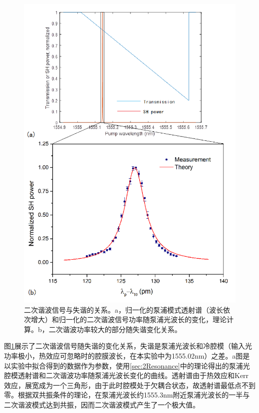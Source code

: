 \documentclass[UTF8,a4paper,cs4size,hyperref]{ctexart}
\begin{document}
\begin{figure}
\centering
\includegraphics[width=14cm ]{TransSHpower}
\caption{二次谐波信号与失谐的关系。a，归一化的泵浦模式透射谱（波长依次增大）和归一化的二次谐波信号功率随泵浦光波长的变化，理论计算。b，二次谐波功率较大的部分随失谐变化关系。}
\label{pic:TransSHpower}
\end{figure}

图\ref{pic:TransSHpower}展示了二次谐波信号随失谐的变化关系，失谐是泵浦光波长和冷腔模（输入光功率极小，热效应可忽略时的腔膜波长，在本实验中为1555.02nm）之差。a图是以实验中拟合得到的数据作为参数，使用\ref{sec:2Resonance}中的理论得出的泵浦光腔模透射谱和二次谐波功率随泵浦光波长变化的曲线。透射谱由于热效应和Kerr效应，展宽成为一个三角形\cite{carmon2004dynamical}，由于此时腔模处于欠耦合状态，故透射谱最低点不到零。根据双共振条件的理论，在泵浦光波长约1555.3nm附近泵浦光波长的一半与二次谐波模式达到共振，因而二次谐波模式产生了一个极大值。
\end{document}
